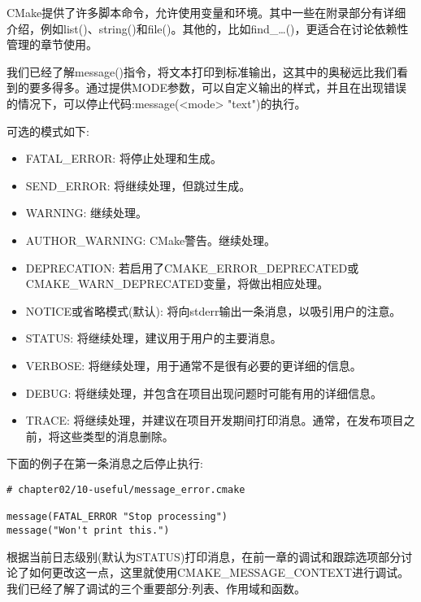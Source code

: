 
CMake提供了许多脚本命令，允许使用变量和环境。其中一些在附录部分有详细介绍，例如list()、string()和file()。其他的，比如find\_…()，更适合在讨论依赖性管理的章节使用。


我们已经了解message()指令，将文本打印到标准输出，这其中的奥秘远比我们看到的要多得多。通过提供MODE参数，可以自定义输出的样式，并且在出现错误的情况下，可以停止代码:message(<mode> "text")的执行。

可选的模式如下:

\begin{itemize}
\item 
FATAL\_ERROR: 将停止处理和生成。

\item 
SEND\_ERROR: 将继续处理，但跳过生成。

\item 
WARNING: 继续处理。

\item 
AUTHOR\_WARNING: CMake警告。继续处理。

\item 
DEPRECATION: 若启用了CMAKE\_ERROR\_DEPRECATED或CMAKE\_WARN\_DEPRECATED变量，将做出相应处理。

\item 
NOTICE或省略模式(默认): 将向stderr输出一条消息，以吸引用户的注意。

\item 
STATUS: 将继续处理，建议用于用户的主要消息。

\item 
VERBOSE: 将继续处理，用于通常不是很有必要的更详细的信息。

\item 
DEBUG: 将继续处理，并包含在项目出现问题时可能有用的详细信息。

\item 
TRACE: 将继续处理，并建议在项目开发期间打印消息。通常，在发布项目之前，将这些类型的消息删除。
\end{itemize}

下面的例子在第一条消息之后停止执行:

\begin{lstlisting}[style=styleCMake]
# chapter02/10-useful/message_error.cmake

message(FATAL_ERROR "Stop processing")
message("Won't print this.")
\end{lstlisting}

根据当前日志级别(默认为STATUS)打印消息，在前一章的调试和跟踪选项部分讨论了如何更改这一点，这里就使用CMAKE\_MESSAGE\_CONTEXT进行调试。我们已经了解了调试的三个重要部分:列表、作用域和函数。

